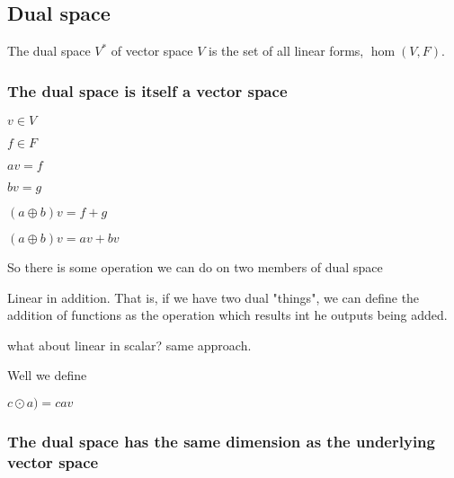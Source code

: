 
\subsection{Dual space}

The dual space \(V^*\) of vector space \(V\) is the set of all linear forms, \(\hom(V,F)\).
\subsubsection{The dual space is itself a vector space}

\(v\in V\)

\(f\in F\)

\(av = f\)

\(bv = g\)

\((a\oplus b)v=f+g\)

\((a\oplus b)v=av + bv\)

So there is some operation we can do on two members of dual space

Linear in addition. That is, if we have two dual "things", we can define the addition of functions as the operation which results int he outputs being added.

what about linear in scalar? same approach.

Well we define 

\(c\odot a)=cav\)

\subsubsection{The dual space has the same dimension as the underlying vector space}

